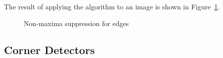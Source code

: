 \documentclass[12pt,a4paper,oneside,openright]{book}
\newcommand{\fig}[1]{Figure~\ref{fig:#1}}
\begin{document}
\begin{CJK}{UTF8}{}
The result of applying the algorithm to an image is shown in \fig{nmsedges}.
\begin{figure}[htbp]
   \begin{center}
     \begin{minipage}[c]{.45\textwidth}
     \end{minipage}
     \begin{minipage}[c]{.45\textwidth}
     \end{minipage}
     \caption{Non-maxima suppression for edges\label{fig:nmsedges}}
   \end{center}
\end{figure}

\subsection{Corner Detectors}\label{cha:corners}

\end{CJK}
\end{document}

